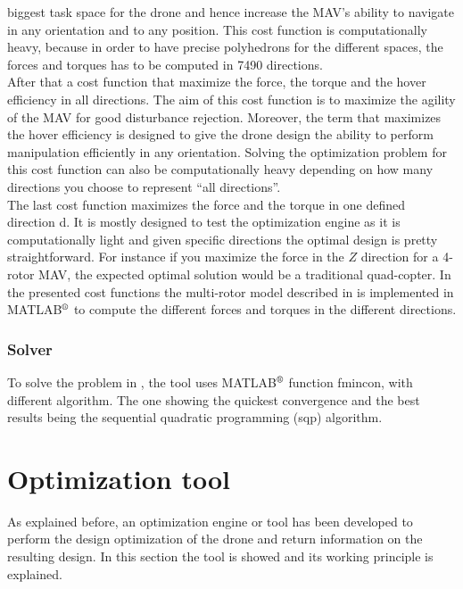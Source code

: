 biggest task space for the drone and hence increase the MAV’s ability to navigate
in any orientation and to any position. This cost function is computationally heavy,
because in order to have precise polyhedrons for the different spaces, the forces and
torques has to be computed in 7490 directions.\\
After that a cost function that maximize the force, the torque and the hover
efficiency in all directions. The aim of this cost function
is to maximize the agility of the MAV for good disturbance rejection. Moreover,
the term that maximizes the hover efficiency is designed to give the drone design
the ability to perform manipulation efficiently in any orientation. Solving the
optimization problem for this cost function can also be computationally heavy
depending on how many directions you choose to represent “all directions”.\\
The last cost function maximizes the force and the torque in one defined
direction d. It is mostly designed to test the optimization engine as it is
computationally light and given specific directions the optimal design is
pretty straightforward. For instance if you maximize the force in the $Z$
direction for a 4-rotor MAV, the expected optimal solution would be a traditional
quad-copter.
In the presented cost functions the multi-rotor model described in
 is implemented in MATLAB$^\textrm{\textregistered}$
to compute the different forces and torques in the different directions.

\subsubsection{Solver}
\label{sec:solver}
To solve the problem in , the tool uses
MATLAB$^\textrm{\textregistered}$ function fmincon, with different algorithm.
The one showing the quickest convergence and the best results being the sequential
quadratic programming (sqp) algorithm.

\section{Optimization tool}
\label{sec:optimization_tool}
As explained before, an optimization engine or tool has been developed to perform
the design optimization of the drone and return information on the resulting design.
In this section the tool is showed and its working principle is explained.
